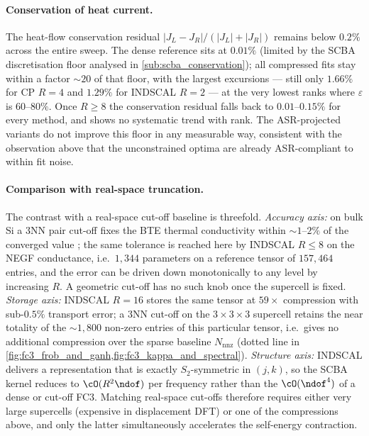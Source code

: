 \paragraph{Conservation of heat current.} The heat-flow conservation residual
$|J_L-J_R|/(|J_L|+|J_R|)$ remains below $0.2\%$ across the entire sweep. The dense reference
sits at $0.01\%$ (limited by the SCBA discretisation floor analysed in
\cref{sub:scba_conservation}); all compressed fits stay within a factor $\sim 20$ of that floor,
with the largest excursions --- still only $1.66\%$ for CP $R=4$ and $1.29\%$ for INDSCAL $R=2$
--- at the very lowest ranks where $\varepsilon$ is $60$--$80\%$. Once $R\ge 8$ the conservation
residual falls back to $0.01$--$0.15\%$ for every method, and shows no systematic trend with
rank. The ASR-projected variants do not improve this floor in any measurable way, consistent
with the observation above that the unconstrained optima are already ASR-compliant to within
fit noise.

\paragraph{Comparison with real-space truncation.} The contrast with a real-space cut-off
baseline is threefold. \emph{Accuracy axis:} on bulk Si a $3$NN pair cut-off fixes
the BTE thermal conductivity within $\sim 1$--$2\%$ of the converged value
\cite{guo_quantum_2020, mcgaughey_phonon_2019}; the same tolerance is reached here by INDSCAL
$R\le 8$ on the NEGF conductance, i.e.\ $1{,}344$ parameters on a reference tensor of
$157{,}464$ entries, and the error can be driven down monotonically to any level by increasing
$R$. A geometric cut-off has no such knob once the supercell is fixed. \emph{Storage axis:}
INDSCAL $R=16$ stores the same tensor at $59\times$ compression with sub-$0.5\%$ transport
error; a $3$NN cut-off on the $3{\times}3{\times}3$ supercell retains the near totality of the
$\sim 1{,}800$ non-zero entries of this particular tensor, i.e.\ gives no additional compression
over the sparse baseline $N_{\mathrm{nnz}}$ (dotted line in
\cref{fig:fc3_frob_and_ganh,fig:fc3_kappa_and_spectral}). \emph{Structure axis:} INDSCAL
delivers a representation that is exactly $S_2$-symmetric in $(j,k)$, so the SCBA kernel
reduces to $\cO(R^{2}\ndof)$ per frequency rather than the $\cO(\ndof^{4})$ of a dense or
cut-off FC3. Matching real-space cut-offs therefore requires either very large supercells
(expensive in displacement DFT) or one of the compressions above, and only the latter
simultaneously accelerates the self-energy contraction.

